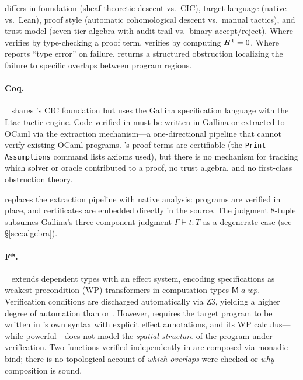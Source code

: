 \JuGeo{} differs in foundation (sheaf-theoretic descent vs.\ CIC),
target language (native \Python{} vs.\ Lean), proof style (automatic
cohomological descent vs.\ manual tactics), and trust model (seven-tier
algebra with audit trail vs.\ binary accept/reject).  Where \LEAN{}
verifies by type-checking a proof term, \JuGeo{} verifies by computing
$H^{1} = 0$.  Where \LEAN{} reports ``type error'' on failure, \JuGeo{}
returns a structured obstruction localizing the failure to specific
overlaps between program regions.

\paragraph{Coq.}
\Coq{}~\cite{coq} shares \LEAN{}'s CIC foundation but uses the Gallina
specification language with the Ltac tactic engine.  Code verified in
\Coq{} must be written in Gallina or extracted to OCaml via the extraction
mechanism---a one-directional pipeline that cannot verify existing OCaml
programs.  \Coq{}'s proof terms are certifiable (the \texttt{Print
Assumptions} command lists axioms used), but there is no mechanism for
tracking which solver or oracle contributed to a proof, no trust algebra,
and no first-class obstruction theory.

\JuGeo{} replaces the extraction pipeline with native \Python{} analysis:
programs are verified in place, and certificates are embedded directly in
the source.  The judgment 8-tuple subsumes Gallina's three-component
judgment $\Gamma \vdash t : T$ as a degenerate case
(see \S\ref{sec:algebra}).

\paragraph{F*.}
\Fstar{}~\cite{fstar} extends dependent types with an effect system,
encoding specifications as weakest-precondition (WP) transformers in
computation types $\mathsf{M}\;a\;\mathit{wp}$.  Verification conditions
are discharged automatically via Z3, yielding a higher degree of automation
than \LEAN{} or \Coq{}.  However, \Fstar{} requires the target program to
be written in \Fstar{}'s own syntax with explicit effect annotations, and
its WP calculus---while powerful---does not model the \emph{spatial
structure} of the program under verification.  Two functions verified
independently in \Fstar{} are composed via monadic bind; there is no
topological account of \emph{which overlaps} were checked or \emph{why}
composition is sound.

